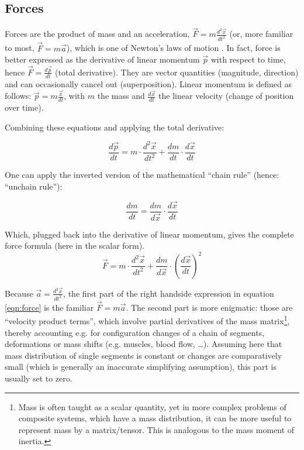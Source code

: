 \subsection{Forces}
\label{sec:orgd6fbc67}
Forces are the product of mass and an acceleration, \(\vec{F}=m\frac{d^2\vec{x}}{dt^2}\) (or, more familiar to most, \(\vec{F}=m\vec{a}\)), which is one of Newton's laws of motion \citep{Newton1687,Tipler2007}.
In fact, force is better expressed as the derivative of linear momentum \(\vec{p}\) with respect to time, hence \(\vec{F}=\frac{d \vec{p}}{d t}\) (total derivative).
They are vector quantities (magnitude, direction) and can occasionally cancel out (superposition).
Linear momentum is defined as follows: \(\vec{p}=m\frac{\vec{x}}{dt}\), with \(m\) the mass and \(\frac{d\vec{x}}{dt}\) the linear velocity (change of position over time).

Combining these equations and applying the total derivative:
\begin{change}
\[\frac{d\vec{p}}{dt} = m \cdot \frac{d^2 \vec{x}}{d t^2} + \frac{d m}{d t} \cdot \frac{d\vec{x}}{dt}\]
\end{change}

One can apply the inverted version of the mathematical ``chain rule'' (hence: ``unchain rule''):
\begin{change}
\[\frac{d m}{d t} = \frac{d m}{d \vec{x}} \cdot \frac{d \vec{x}}{d t} \]
\end{change}

Which, plugged back into the derivative of linear momentum, gives the complete force formula (here in the scalar form).
\begin{equation}\label{eqn:force}
\vec{F} = m \cdot \frac{d^2 \vec{x}}{d t^2} + \frac{d m}{d \vec{x}} \cdot \left(\frac{d\vec{x}}{dt}\right)^2
\end{equation}



Because \(\vec{a}=\frac{d^2\vec{x}}{dt^2}\), the first part of the right handside expression in equation \eqref{eqn:force} is the familiar \(\vec{F}=m\vec{a}\).
The second part is more enigmatic: those are ``velocity product terms'', which involve partial derivatives of the mass matrix\footnote{Mass is often taught as a scalar quantity, yet in more complex problems of composite systems, which have a mass distribution, it can be more useful to represent mass by a matrix/tensor. This is analogous to the mass moment of inertia.}, thereby accounting e.g. for configuration changes of a chain of segments, deformations or mass shifts (e.g. muscles, blood flow, \ldots{}).
Assuming here that mass distribution of single segments is constant or changes are comparatively small (which is generally an inaccurate simplifying assumption), this part is usually set to zero.

